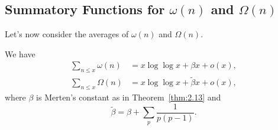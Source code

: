 \subsection{Summatory Functions for $\omega(n)$ and $\Omega(n)$}\label{subsec:4.2} 
Let's now consider the averages of $\omega(n)$ and $\Omega(n)$. 

\begin{thm}\label{thm:4.4}
    We have 
    \begin{align*}
        \sum_{n\leq x} \omega(n) &= x\log\log x + \beta x + o(x), \\ 
        \sum_{n\leq x} \Omega(n) &= x\log\log x + \tilde\beta x + o(x), 
    \end{align*}
    where $\beta$ is Merten's constant as in Theorem~\ref{thm:2.13} and 
    \[ \tilde\beta = \beta + \sum_p \frac{1}{p(p-1)}. \] 
\end{thm}
